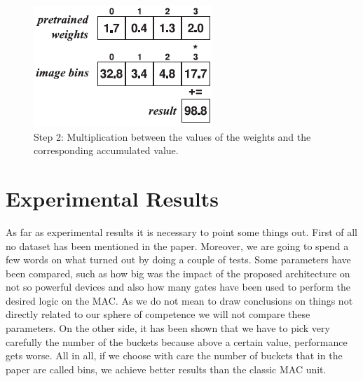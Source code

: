 \FloatBarrier

\begin{figure}[h!]
    \centering
    \includegraphics[scale=0.70]{images/09_3.png}
    \caption{Step 2: Multiplication between the values of the weights and the corresponding accumulated value.}
    \label{fig:09_3}
\end{figure}

\FloatBarrier

\section{Experimental Results}

As far as experimental results it is necessary to point some things out. First of all no dataset has been mentioned in the paper. Moreover, we are going to spend a few words on what turned out by doing a couple of tests. Some parameters have been compared, such as how big was the impact of the proposed architecture on not so powerful devices and also how many gates have been used to perform the desired logic on the MAC. As we do not mean to draw conclusions on things not directly related to our sphere of competence we will not compare these parameters. On the other side, it has been shown that we have to pick very carefully the number of the buckets because above a certain value, performance gets worse. All in all, if we choose with care the number of buckets that in the paper are called bins, we achieve better results than the classic MAC unit.
